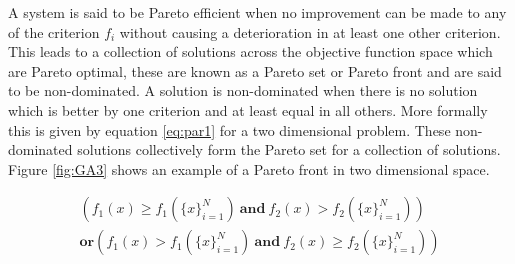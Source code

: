 \documentclass{article}
\begin{document}
			A system is said to be Pareto efficient when no improvement can be made to any of the criterion \(f_i\) without causing a deterioration in at least one other criterion. This leads to a collection of solutions across the objective function space which are Pareto optimal, these are known as a Pareto set or Pareto front and are said to be non-dominated. A solution is non-dominated when there is no solution which is better by one criterion and at least equal in all others. More formally this is given by equation \ref{eq:par1} for a two dimensional problem. These non-dominated solutions collectively form the Pareto set for a collection of solutions. Figure \ref{fig:GA3} shows an example of a Pareto front in two dimensional space.


			\begin{equation}\label{eq:par1}
			\begin{aligned}
			(f_1(x) \geq f_1(\{x\}_{i=1}^N) ~\bm{and}~ f_2(x) > f_2(\{x\}_{i=1}^N))\\
			\bm{or}(f_1(x) > f_1(\{x\}_{i=1}^N) ~\bm{and}~ f_2(x) \geq f_2(\{x\}_{i=1}^N))
			\end{aligned}
			\end{equation}
\end{document}
